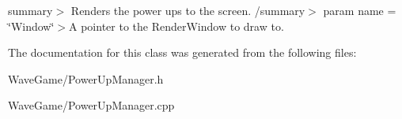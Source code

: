 summary$>$ Renders the power ups to the screen. /summary$>$ param name = \char`\"{}\+Window\char`\"{}$>$A pointer to the Render\+Window to draw to.

The documentation for this class was generated from the following files\+:\begin{DoxyCompactItemize}
\item 
Wave\+Game/Power\+Up\+Manager.\+h\item 
Wave\+Game/Power\+Up\+Manager.\+cpp\end{DoxyCompactItemize}
